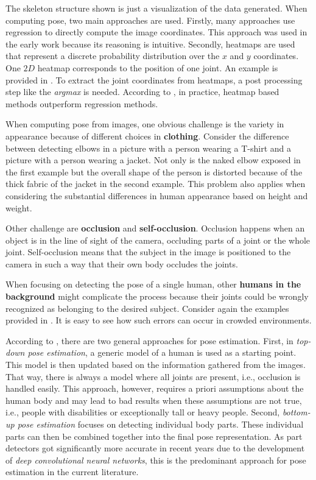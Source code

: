 The skeleton structure shown is just a visualization of the data generated.
When computing pose, two main approaches are used.
Firstly, many approaches use regression to directly compute the image coordinates.
This approach was used in the early work because its reasoning is intuitive.
Secondly, heatmaps are used that represent a discrete probability distribution over the $x$ and $y$ coordinates.
One $2D$ heatmap corresponds to the position of one joint.
An example is provided in .
To extract the joint coordinates from heatmaps, a post processing step like the \textit{argmax} is needed.
According to \cite{luvizon_2d/3d_2018}, in practice, heatmap based methods outperform regression methods.

When computing pose from images, one obvious challenge is the variety in appearance because of different choices in \textbf{clothing}.
Consider the difference between detecting elbows in a picture with a person wearing a T-shirt and a picture with a person wearing a jacket.
Not only is the naked elbow exposed in the first example but the overall shape of the person is distorted because of the thick fabric of the jacket in the second example.
This problem also applies when considering the substantial differences in human appearance based on height and weight.

Other challenge are \textbf{occlusion} and \textbf{self-occlusion}. Occlusion happens when an object is in the line of sight of the camera, occluding parts of a joint or the whole joint.
Self-occlusion means that the subject in the image is positioned to the camera in such a way that their own body occludes the joints.

When focusing on detecting the pose of a single human, other \textbf{humans in the background} might complicate the process because their joints could be wrongly recognized as belonging to the desired subject.
Consider again the examples provided in .
It is easy to see how such errors can occur in crowded environments.

According to \cite{zhu_articulated_2016}, there are two general approaches for pose estimation.
First, in \textit{top-down pose estimation}, a generic model of a human is used as a starting point.
This model is then updated based on the information gathered from the images.
That way, there is always a model where all joints are present, i.e., occlusion is handled easily.
This approach, however, requires a priori assumptions about the human body and may lead to bad results when these assumptions are not true, i.e., people with disabilities or exceptionally tall or heavy people.
Second, \textit{bottom-up pose estimation} focuses on detecting individual body parts.
These individual parts can then be combined together into the final pose representation.
As part detectors got significantly more accurate in recent years due to the development of \textit{deep convolutional neural networks}, this is the predominant approach for pose estimation in the current literature.


